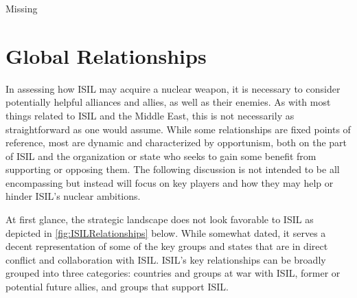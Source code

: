 \documentclass{report}
\begin{document}
Missing

\section{Global Relationships} \label{sec:global_rels}





In assessing how ISIL may acquire a nuclear weapon, it is necessary to consider potentially helpful alliances and allies, as well as their enemies.  As with most things related to ISIL and the Middle East, this is not necessarily as straightforward as one would assume.  While some relationships are fixed points of reference, most are dynamic and characterized by opportunism, both on the part of ISIL and the organization or state who seeks to gain some benefit from supporting or opposing them.  The following discussion is not intended to be all encompassing but instead will focus on key players and how they may help or hinder ISIL's nuclear ambitions.  

At first glance, the strategic landscape does not look favorable to ISIL as depicted in \autoref{fig:ISILRelationships} below.  While somewhat dated, it serves a decent representation of some of the key groups and states that are in direct conflict and collaboration with ISIL.  ISIL's key relationships can be broadly grouped into three categories:  countries and groups at war with ISIL, former or potential future allies, and groups that support ISIL.  
\end{document}
